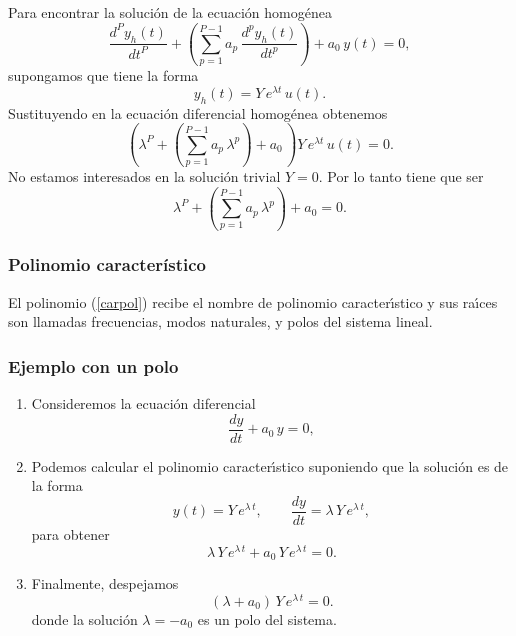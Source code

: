 Para encontrar la soluci\'{o}n de la ecuaci\'{o}n homog\'{e}nea 
\begin{equation}
	\frac{d^{P}y_{h}\left( t\right) }{dt^{P}} +
	\left(\sum_{p=1}^{P-1}a_{p} \, \frac{d^{p}y_{h}\left( t\right) }{dt^{p}}\right) + a_{0} \, y(t)=0,
\end{equation}
supongamos que tiene la forma 
\begin{equation}
	y_{h}\left( t\right) = Y \, e^{\lambda t} \, u(t).
\end{equation}
Sustituyendo en la ecuaci\'{o}n diferencial homog\'{e}nea obtenemos 
\begin{equation}
	\left(\lambda^{P} + \left(
	\sum_{p=1}^{P-1}a_{p} \, \lambda^{p}\right) + a_{0} \, \right) Y \, e^{\lambda t} \, u(t) = 0.
\end{equation}
No estamos interesados en la soluci\'{o}n trivial $Y=0$. Por lo tanto tiene que ser 
\begin{equation}
	\lambda^{P} + \left(\sum_{p=1}^{P-1}a_{p} \, \lambda^{p}\right) + a_{0} = 0. \label{carpol}
\end{equation}

\subsubsection{Polinomio característico}

El polinomio (\ref{carpol}) recibe el nombre de polinomio caracter\'{\i}stico y sus ra\'{\i}ces son llamadas frecuencias, modos naturales, y polos del sistema lineal.

\subsubsection{Ejemplo con un polo}

\begin{enumerate}
	\item Consideremos la ecuaci\'{o}n diferencial 
	\begin{equation}
		\frac{dy}{dt}+a_{0} \, y = 0,
	\end{equation}
	
	\item Podemos calcular el polinomio caracter\'{\i}stico suponiendo que la soluci\'{o}n es de la forma
	\begin{equation}
		y\left( t\right) = Y \, e^{\lambda \, t}, \qquad
		\frac{dy}{dt}=\lambda \, Y \, e^{\lambda \, t},
	\end{equation}
	para obtener 
	\begin{equation}
		\lambda \, Y \, e^{\lambda \, t}+a_{0} \, Y \, e^{\lambda \, t}= 0.
	\end{equation}
	
	\item Finalmente, despejamos
	\begin{equation}
		\left(\lambda +a_{0} \right) \, Y \, e^{\lambda \, t}= 0.
	\end{equation}
	donde la soluci\'{o}n $\lambda = - a_{0}$ es un polo del sistema.
\end{enumerate}

